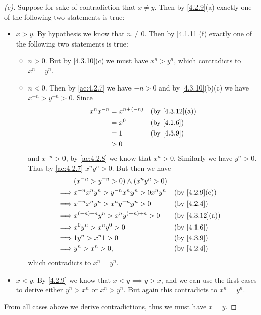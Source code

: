 \begin{proof}[(c)]
  Suppose for sake of contradiction that \(x \neq y\).
  Then by \cref{4.2.9}(a) exactly one of the following two statements is true:
  \begin{itemize}
    \item \(x > y\).
          By hypothesis we know that \(n \neq 0\).
          Then by \cref{4.1.11}(f) exactly one of the following two statements is true:
          \begin{itemize}
            \item \(n > 0\).
                  But by \cref{4.3.10}(c) we must have \(x^n > y^n\), which contradicts to \(x^n = y^n\).
            \item \(n < 0\).
                  Then by \cref{ac:4.2.7} we have \(-n > 0\) and by \cref{4.3.10}(b)(c) we have \(x^{-n} > y^{-n} > 0\).
                  Since
                  \begin{align*}
                    x^n x^{-n} & = x^{n + (-n)} &  & \by{4.3.12}[a] \\
                               & = x^0          &  & \by{4.1.6}     \\
                               & = 1            &  & \by{4.3.9}     \\
                               & > 0
                  \end{align*}
                  and \(x^{-n} > 0\), by \cref{ac:4.2.8} we know that \(x^n > 0\).
                  Similarly we have \(y^n > 0\).
                  Thus by \cref{ac:4.2.7} \(x^n y^n > 0\).
                  But then we have
                  \begin{align*}
                             & (x^{-n} > y^{-n} > 0) \land (x^n y^n > 0)                       \\
                    \implies & x^{-n} x^n y^n > y^{-n} x^n y^n > 0 x^n y^n &  & \by{4.2.9}[e]  \\
                    \implies & x^{-n} x^n y^n > x^n y^{-n} y^n > 0         &  & \by{4.2.4}     \\
                    \implies & x^{(-n) + n} y^n > x^n y^{(-n) + n} > 0     &  & \by{4.3.12}[a] \\
                    \implies & x^0 y^n > x^n y^0 > 0                       &  & \by{4.1.6}     \\
                    \implies & 1 y^n > x^n 1 > 0                           &  & \by{4.3.9}     \\
                    \implies & y^n > x^n > 0,                              &  & \by{4.2.4}
                  \end{align*}
                  which contradicts to \(x^n = y^n\).
          \end{itemize}
    \item \(x < y\).
          By \cref{4.2.9} we know that \(x < y \implies y > x\), and we can use the first cases to derive either \(y^n > x^n\) or \(x^n > y^n\).
          But again this contradicts to \(x^n = y^n\).
  \end{itemize}
  From all cases above we derive contradictions, thus we must have \(x = y\).
\end{proof}

